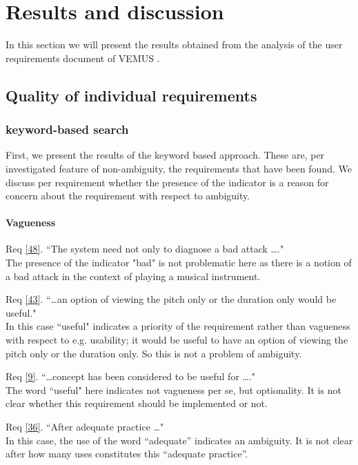 \documentclass[a4paper,twoside, twocolumn,11pt]{article}
\numberwithin{equation}{section}
\begin{document}

\section{Results and discussion}
In this section we will present the results obtained from the analysis of the user requirements document of VEMUS \cite{VEMUS}.

\subsection{Quality of individual requirements}
\subsubsection{keyword-based search}
First, we present the results of the keyword based approach. These are, per investigated feature of non-ambiguity, the requirements that have been found. We discuss per requirement whether the presence of the indicator is a reason for concern about the requirement with respect to ambiguity.
\paragraph{Vagueness} 
Req \ref{48}. ``The system need not only to diagnose a bad attack \ldots." \\
The presence of the indicator "bad" is not problematic here as there is a notion of a bad attack in the context of playing a musical instrument.

Req \ref{43}. ``\ldots an option of viewing the pitch only or the duration only would be useful."\\  In this case ``useful" indicates a priority of the requirement rather than vagueness with respect to e.g. usability; it would be useful to have an option of viewing the pitch only or the duration only. So this is not a problem of ambiguity.

Req \ref{9}. ``\ldots concept has been considered to be useful for \ldots."\\
The word ``useful"  here indicates not vagueness per se, but optionality. It is not clear whether this requirement should be implemented or not.

Req \ref{36}. ``After adequate practice \ldots "\\
 In this case, the use of the word ``adequate'' indicates an ambiguity. It is not clear after how many uses constitutes this ``adequate practice''.
\end{document}
